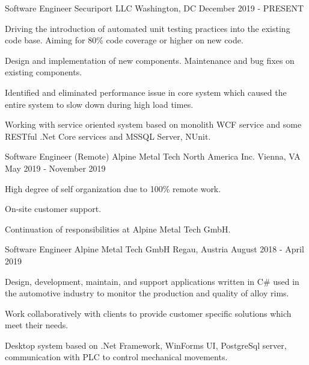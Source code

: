 
\begin{cventries}
  \cventry
    {Software Engineer} %
    {Securiport LLC} %
    {Washington, DC} %
    {December 2019 - PRESENT} %
    {
      \begin{cvitems} %
        \item {Driving the introduction of automated unit testing practices into the existing code base. Aiming for 80\% code coverage or higher on new code.}
        \item {Design and implementation of new components. Maintenance and bug fixes on existing components.}
        \item {Identified and eliminated performance issue in core system which caused the entire system to slow down during high load times.}
        \item {Working with service oriented system based on monolith WCF service and some RESTful .Net Core services and MSSQL Server, NUnit.}
      \end{cvitems}
    }

  \cventry
    {Software Engineer (Remote)} %
    {Alpine Metal Tech North America Inc.} %
    {Vienna, VA} %
    {May 2019 - November 2019} %
    {
      \begin{cvitems} %
        \item {High degree of self organization due to 100\% remote work.}
        \item {On-site customer support.}
        \item {Continuation of responsibilities at Alpine Metal Tech GmbH.}
      \end{cvitems}
    }

    \cventry
    {Software Engineer} %
    {Alpine Metal Tech GmbH} %
    {Regau, Austria} %
    {August 2018 - April 2019} %
    {
      \begin{cvitems} %
        \item {Design, development, maintain, and support applications written in C\# used in the automotive industry to monitor the production and quality of alloy rims.}
        \item {Work collaboratively with clients to provide customer specific solutions which meet their needs.}
        \item {Desktop system based on .Net Framework, WinForms UI, PostgreSql server, communication with PLC to control mechanical movements.}
      \end{cvitems}
    }


\end{cventries}
